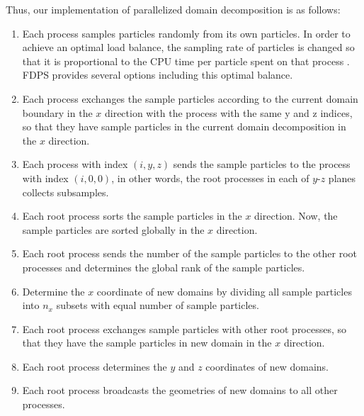 Thus, our implementation of parallelized domain decomposition
is as follows:

\begin{enumerate}
\item
Each process samples particles randomly from its own particles. In
order to achieve an optimal load balance, the sampling rate of
particles is changed so that it is proportional to the CPU time per
particle spent on that process \citep{2009PASJ...61.1319I}. FDPS
provides several options including this optimal
balance. \label{prcoc:sampling}

\item
Each process exchanges the sample particles according to the current
domain boundary in the $x$ direction with the process with the same y
and z indices, so that they have sample particles in the current
domain decomposition in the $x$ direction.


\label{proc:commx}

\item
Each process with index $(i,y,z)$ sends the sample particles to the
process with index $(i,0,0)$, in other words, the root processes in
each of $y$-$z$ planes collects subsamples.

\label{proc:gatherx}

\item
Each root process sorts the sample particles in the $x$ direction. Now,
the sample particles are sorted globally in the $x$ direction.

\item
Each root process sends the number of the sample particles to the
other root processes and determines the global rank of the sample
particles.

\item
Determine the $x$ coordinate of new domains by dividing all sample
particles into $n_x$ subsets with equal number of sample particles.
\label{proc:determinex}

\item
Each root process exchanges sample particles with other root
processes, so that they have the sample particles in new domain in the
$x$ direction.



\item
Each root process determines the $y$ and $z$ coordinates of new domains.
\label{proc:detyz}

\item
Each root process broadcasts the geometries of new domains to all
other processes.
\label{proc:broadcasting}

\end{enumerate}

